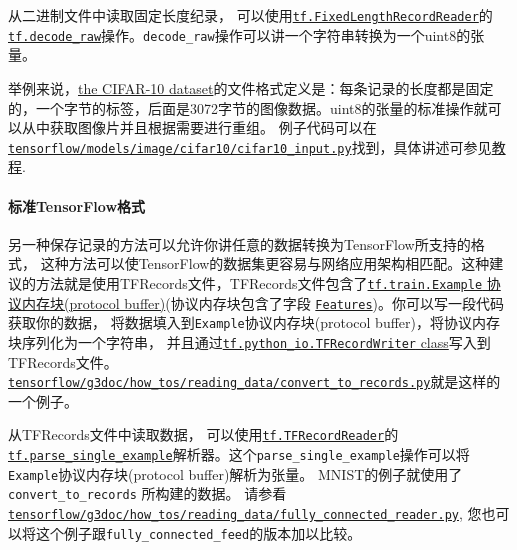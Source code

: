 从二进制文件中读取固定长度纪录，
可以使用\href{tensorflow-zh/SOURCE/api_docs/python/io_ops.md\#FixedLengthRecordReader}{\texttt{tf.FixedLengthRecordReader}}的\href{tensorflow-zh/SOURCE/api_docs/python/io_ops.md\#decode_raw}{\texttt{tf.decode\_raw}}操作。\texttt{decode\_raw}操作可以讲一个字符串转换为一个uint8的张量。

举例来说，\href{http://www.cs.toronto.edu/~kriz/cifar.html}{the CIFAR-10
dataset}的文件格式定义是：每条记录的长度都是固定的，一个字节的标签，后面是3072字节的图像数据。uint8的张量的标准操作就可以从中获取图像片并且根据需要进行重组。
例子代码可以在\href{https://tensorflow.googlesource.com/tensorflow/+/master/tensorflow/models/image/cifar10/cifar10_input.py}{\texttt{tensorflow/models/image/cifar10/cifar10\_input.py}}找到，具体讲述可参见\href{tensorflow-zh/SOURCE/tutorials/deep_cnn/index.md\#prepare-the-data}{教程}.

\paragraph{标准TensorFlow格式
}\label{ux6807ux51c6tensorflowux683cux5f0f}

另一种保存记录的方法可以允许你讲任意的数据转换为TensorFlow所支持的格式，
这种方法可以使TensorFlow的数据集更容易与网络应用架构相匹配。这种建议的方法就是使用TFRecords文件，TFRecords文件包含了\href{https://tensorflow.googlesource.com/tensorflow/+/master/tensorflow/core/example/example.proto}{\texttt{tf.train.Example}
协议内存块(protocol buffer)}(协议内存块包含了字段
\href{https://tensorflow.googlesource.com/tensorflow/+/master/tensorflow/core/example/feature.proto}{\texttt{Features}})。你可以写一段代码获取你的数据，
将数据填入到\texttt{Example}协议内存块(protocol
buffer)，将协议内存块序列化为一个字符串，
并且通过\href{tensorflow-zh/SOURCE/api_docs/python/python_io.md\#TFRecordWriter}{\texttt{tf.python\_io.TFRecordWriter}
class}写入到TFRecords文件。\href{https://tensorflow.googlesource.com/tensorflow/+/master/tensorflow/g3doc/how_tos/reading_data/convert_to_records.py}{\texttt{tensorflow/g3doc/how\_tos/reading\_data/convert\_to\_records.py}}就是这样的一个例子。

从TFRecords文件中读取数据，
可以使用\href{tensorflow-zh/SOURCE/api_docs/python/io_ops.md\#TFRecordReader}{\texttt{tf.TFRecordReader}}的\href{tensorflow-zh/SOURCE/api_docs/python/io_ops.md\#parse_single_example}{\texttt{tf.parse\_single\_example}}解析器。这个\texttt{parse\_single\_example}操作可以将\texttt{Example}协议内存块(protocol
buffer)解析为张量。 MNIST的例子就使用了\texttt{convert\_to\_records}
所构建的数据。
请参看\href{https://tensorflow.googlesource.com/tensorflow/+/master/tensorflow/g3doc/how_tos/reading_data/fully_connected_reader.py}{\texttt{tensorflow/g3doc/how\_tos/reading\_data/fully\_connected\_reader.py}},
您也可以将这个例子跟\texttt{fully\_connected\_feed}的版本加以比较。


